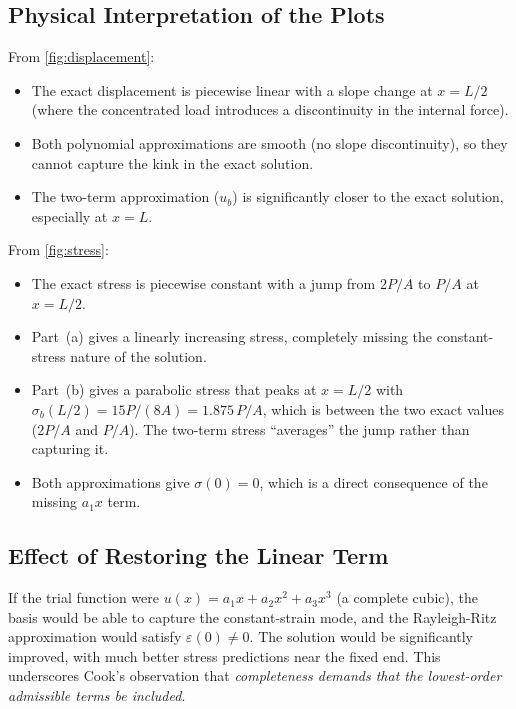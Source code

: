 \documentclass[11pt, a4paper]{article}
\begin{document}
\subsection{Physical Interpretation of the Plots}

From \cref{fig:displacement}:
\begin{itemize}
    \item The exact displacement is piecewise linear with a slope change at $x = L/2$ (where the concentrated load introduces a discontinuity in the internal force).
    \item Both polynomial approximations are smooth (no slope discontinuity), so they cannot capture the kink in the exact solution.
    \item The two-term approximation ($u_b$) is significantly closer to the exact solution, especially at $x = L$.
\end{itemize}

From \cref{fig:stress}:
\begin{itemize}
    \item The exact stress is piecewise constant with a jump from $2P/A$ to $P/A$ at $x = L/2$.
    \item Part~(a) gives a linearly increasing stress, completely missing the constant-stress nature of the solution.
    \item Part~(b) gives a parabolic stress that peaks at $x = L/2$ with $\sigma_b(L/2) = 15P/(8A) = 1.875\,P/A$, which is between the two exact values ($2P/A$ and $P/A$).  The two-term stress ``averages'' the jump rather than capturing it.
    \item Both approximations give $\sigma(0) = 0$, which is a direct consequence of the missing $a_1 x$ term.
\end{itemize}

\subsection{Effect of Restoring the Linear Term}

If the trial function were $u(x) = a_1 x + a_2 x^2 + a_3 x^3$ (a complete cubic), the basis would be able to capture the constant-strain mode, and the Rayleigh-Ritz approximation would satisfy $\varepsilon(0) \neq 0$.  The solution would be significantly improved, with much better stress predictions near the fixed end.  This underscores Cook's observation that \textit{completeness demands that the lowest-order admissible terms be included}.
\end{document}
